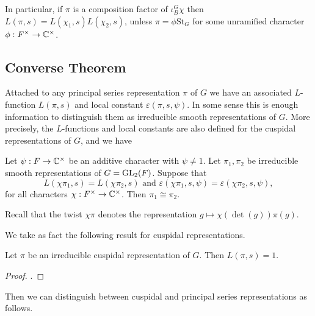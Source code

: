 In particular, if $\pi$ is a composition factor of $\iota_B^G \chi$ then $L(\pi,s) = L(\chi_1,s)L(\chi_2,s)$, unless $\pi = \phi \mathrm{St}_G$ for some unramified character $\phi : F^\times \to \mathbb{C}^\times$.

\subsection{Converse Theorem}

Attached to any principal series representation $\pi$ of $G$ we have an associated $L$-function $L(\pi,s)$ and local constant $\varepsilon(\pi,s,\psi)$. In some sense this is enough information to distinguish them as irreducible smooth representations of $G$. More precisely, the $L$-functions and local constants are also defined for the cuspidal representations of $G$, and we have

\begin{thm}\label{thm:converse}
    Let $\psi:F \to \mathbb{C}^\times$ be an additive character with $\psi \neq 1$. Let $\pi_1,\pi_2$ be irreducible smooth representations of $G=\mathrm{GL}_2(F)$. Suppose that 
    $$L(\chi\pi_1,s)=L(\chi\pi_2,s) \text{   and   } \varepsilon(\chi\pi_1,s,\psi) = \varepsilon(\chi\pi_2,s,\psi),$$ for all characters $\chi :F^\times \to \mathbb{C}^\times$. Then $\pi_1 \cong \pi_2$.
\end{thm}

Recall that the twist $\chi\pi$ denotes the representation $g \mapsto \chi(\det(g))\pi(g)$.

We take as fact the following result for cuspidal representations.

\begin{prop}\label{prop:cuspL}
    Let $\pi$ be an irreducible cuspidal representation of $G$. Then $L(\pi,s)=1$.
\end{prop}
\begin{proof}
    \cite[Corollary 24.5]{BH1}.
\end{proof}

Then we can distinguish between cuspidal and principal series representations as follows.

